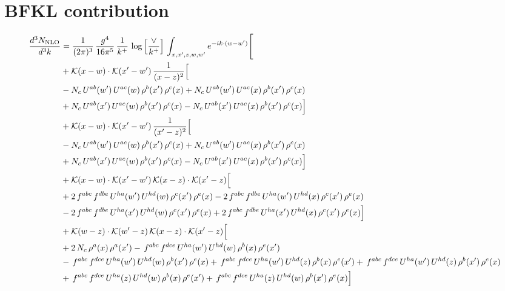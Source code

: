 \documentclass[9pt]{article}
\numberwithin{equation}{section}
\begin{document}
\section{BFKL contribution}
\begin{align}
\frac{d^{3}N_{\mathrm{NLO}}}{d^{3}k} & = \frac{1}{(2\pi)^{3}}\,\frac{g^{4}}{16\pi^{5}}\,\frac{1}{k^{+}}\,\log\Big[\frac{\vee}{k^{+}}\Big]\,\int_{x,x',z,w,w'}e^{-ik\cdot(w-w')}\Bigg[ \notag\\
& +\mathcal{K}(x-w)\cdot\mathcal{K}(x'-w')\,\frac{1}{(x-z)^{2}}\Big[\notag\\
& -N_{c}\,U^{ab}(w')\,U^{ac}(w)\,\rho^{b}(x')\,\rho^{c}(x) +N_{c}\,U^{ab}(w')\,U^{ac}(x)\,\rho^{b}(x')\,\rho^{c}(x)\notag\\
& +N_{c}\,U^{ab}(x')\,U^{ac}(w)\,\rho^{b}(x')\,\rho^{c}(x) -N_{c}\,U^{ab}(x')\,U^{ac}(x)\,\rho^{b}(x')\,\rho^{c}(x)\Big]\notag\\
& +\mathcal{K}(x-w)\cdot\mathcal{K}(x'-w')\,\frac{1}{(x'-z)^{2}}\Big[\notag\\
& -N_{c}\,U^{ab}(w')\,U^{ac}(w)\,\rho^{b}(x')\,\rho^{c}(x) +N_{c}\,U^{ab}(w')\,U^{ac}(x)\,\rho^{b}(x')\,\rho^{c}(x)\notag\\
& +N_{c}\,U^{ab}(x')\,U^{ac}(w)\,\rho^{b}(x')\,\rho^{c}(x) -N_{c}\,U^{ab}(x')\,U^{ac}(x)\,\rho^{b}(x')\,\rho^{c}(x)\Big]\notag\\
& +\mathcal{K}(x-w)\cdot\mathcal{K}(x'-w')\,\mathcal{K}(x-z)\cdot\mathcal{K}(x'-z)\Big[\notag\\
& +2\,f^{abc}\,f^{dbe}\,U^{ha}(w')\,U^{hd}(w)\,\rho^{c}(x')\,\rho^{e}(x) -2\,f^{abc}\,f^{dbe}\,U^{ha}(w')\,U^{hd}(x)\,\rho^{c}(x')\,\rho^{e}(x)\notag\\
& -2\,f^{abc}\,f^{dbe}\,U^{ha}(x')\,U^{hd}(w)\,\rho^{c}(x')\,\rho^{e}(x) +2\,f^{abc}\,f^{dbe}\,U^{ha}(x')\,U^{hd}(x)\,\rho^{c}(x')\,\rho^{e}(x)\Big]\notag\\
& +\mathcal{K}(w-z)\cdot\mathcal{K}(w'-z)\,\mathcal{K}(x-z)\cdot\mathcal{K}(x'-z)\Big[\notag\\
& +2\,N_{c}\,\rho^{a}(x)\,\rho^{a}(x') -\,f^{abc}\,f^{dce}\,U^{ha}(w')\,U^{hd}(w)\,\rho^{b}(x)\,\rho^{e}(x')\notag\\
& -\,f^{abc}\,f^{dce}\,U^{ha}(w')\,U^{hd}(w)\,\rho^{b}(x')\,\rho^{e}(x) +\,f^{abc}\,f^{dce}\,U^{ha}(w')\,U^{hd}(z)\,\rho^{b}(x)\,\rho^{e}(x') +\,f^{abc}\,f^{dce}\,U^{ha}(w')\,U^{hd}(z)\,\rho^{b}(x')\,\rho^{e}(x)\notag\\
& +\,f^{abc}\,f^{dce}\,U^{ha}(z)\,U^{hd}(w)\,\rho^{b}(x)\,\rho^{e}(x') +\,f^{abc}\,f^{dce}\,U^{ha}(z)\,U^{hd}(w)\,\rho^{b}(x')\,\rho^{e}(x)\Big]\notag\\

\end{align}
\end{document}
